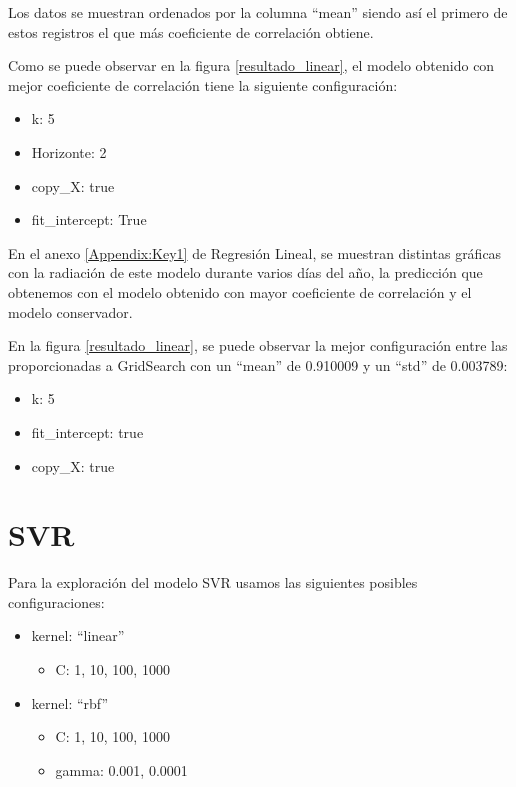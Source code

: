 Los datos se muestran ordenados por la columna ``mean'' siendo así el primero de estos registros el que más coeficiente de correlación obtiene.

Como se puede observar en la figura \ref{resultado_linear}, el modelo obtenido con mejor coeficiente de correlación tiene la siguiente configuración:

\begin{itemize}
\item k: 5
\item Horizonte: 2
\item copy\_X: true
\item fit\_intercept: True
\end{itemize}

En el anexo \ref{Appendix:Key1} de Regresión Lineal, se muestran distintas gráficas con la radiación de este modelo durante varios días del año, la predicción que obtenemos con el modelo obtenido con mayor coeficiente de correlación y el modelo conservador.

En la figura \ref{resultado_linear}, se puede observar la mejor configuración entre las proporcionadas a GridSearch con un ``mean'' de 0.910009 y un ``std'' de 0.003789:

\begin{itemize}
\item k: 5
\item fit\_intercept: true
\item copy\_X: true
\end{itemize} 

\section{SVR}
\label{makereference7.2}

Para la exploración del modelo SVR usamos las siguientes posibles configuraciones:

\begin{itemize}
	\item kernel: ``linear''
	\begin{itemize}
		\item C: 1, 10, 100, 1000
	\end{itemize}
	\item kernel: ``rbf''
	\begin{itemize}
		\item C: 1, 10, 100, 1000
		\item gamma: 0.001, 0.0001
	\end{itemize}
\end{itemize}

